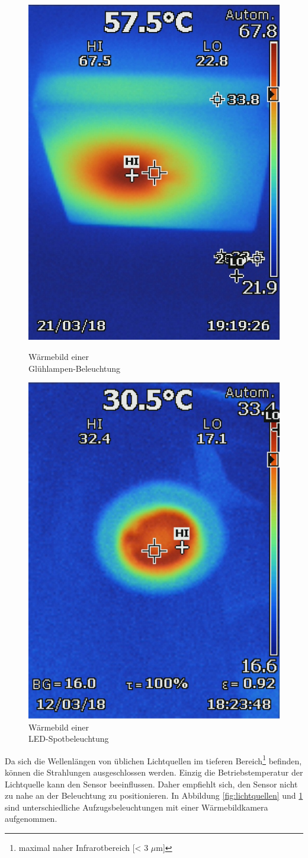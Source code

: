 \begin{figure}[!ht]
	\centering
	\begin{minipage}[b]{0.49\linewidth}
	\centering
	\includegraphics[width=0.5\linewidth]{fig/Lichtquellen.jpg}
	\caption{Wärmebild einer\\ Glühlampen-Beleuchtung}
	\label{fig:lichtquellen}
	\end{minipage}
	\hfill
	\begin{minipage}[b]{0.49\linewidth}
	\centering
	\includegraphics[width=0.5\linewidth]{fig/Lichtquelle.png}
	\caption{Wärmebild einer\\ LED-Spotbeleuchtung}
	\label{fig:m2lichtquelle}
	\end{minipage}
\end{figure}

Da sich die Wellenlängen von üblichen Lichtquellen im tieferen Bereich\footnote[11]{maximal naher Infrarotbereich [< 3 $\mu$m]} befinden, können die Strahlungen ausgeschlossen werden. Einzig die Betriebstemperatur der Lichtquelle kann den Sensor beeinflussen. Daher empfiehlt sich, den Sensor nicht zu nahe an der Beleuchtung zu positionieren. In Abbildung \ref{fig:lichtquellen}  und \ref{fig:m2lichtquelle} sind unterschiedliche Aufzugsbeleuchtungen mit einer Wärmebildkamera aufgenommen.



